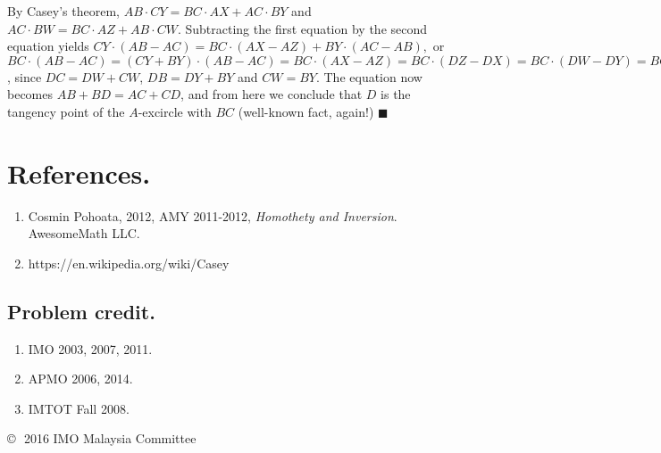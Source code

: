 \documentclass[11pt,a4paper]{article}
\begin{document}
By Casey's theorem, $AB\cdot CY=BC\cdot AX+AC\cdot BY$ and $AC\cdot BW=BC\cdot AZ+AB\cdot CW$. Subtracting the first equation by the second equation yields $CY\cdot (AB-AC)=BC\cdot (AX-AZ)+BY\cdot (AC-AB),$ or $BC\cdot (AB-AC)=(CY+BY)\cdot (AB-AC)=BC\cdot (AX-AZ)=BC\cdot (DZ-DX)=BC\cdot (DW-DY)=BC\cdot (DC-DB)$, since $DC=DW+CW$, $DB=DY+BY$ and $CW=BY$. The equation now becomes $AB+BD=AC+CD$, and from here we conclude that $D$ is the tangency point of the $A$-excircle with $BC$ (well-known fact, again!) $\blacksquare$


\section {References.}
\begin{enumerate}
\item Cosmin Pohoata, 2012, AMY 2011-2012, \emph {Homothety and Inversion}. AwesomeMath LLC.
\item https://en.wikipedia.org/wiki/Casey%
\end{enumerate}

\subsection {Problem credit.}
\begin{enumerate}
\item IMO 2003, 2007, 2011.
\item APMO 2006, 2014.
\item IMTOT Fall 2008.

\end{enumerate}
\vspace{5mm} \noindent \copyright \,\, 2016 IMO Malaysia Committee
\end{document}
